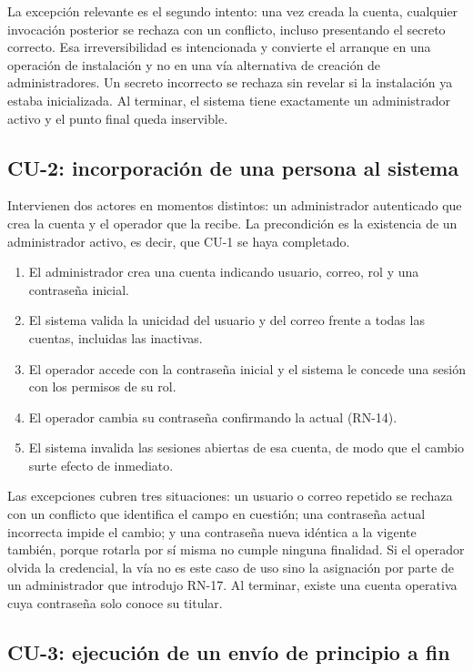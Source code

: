 La excepción relevante es el segundo intento: una vez creada la cuenta, cualquier invocación posterior se rechaza con un conflicto, incluso presentando el secreto correcto. Esa irreversibilidad es intencionada y convierte el arranque en una operación de instalación y no en una vía alternativa de creación de administradores. Un secreto incorrecto se rechaza sin revelar si la instalación ya estaba inicializada. Al terminar, el sistema tiene exactamente un administrador activo y el punto final queda inservible.

\subsection*{CU-2: incorporación de una persona al sistema}

Intervienen dos actores en momentos distintos: un administrador autenticado que crea la cuenta y el operador que la recibe. La precondición es la existencia de un administrador activo, es decir, que CU-1 se haya completado.

\begin{enumerate}
  \item El administrador crea una cuenta indicando usuario, correo, rol y una contraseña inicial.
  \item El sistema valida la unicidad del usuario y del correo frente a todas las cuentas, incluidas las inactivas.
  \item El operador accede con la contraseña inicial y el sistema le concede una sesión con los permisos de su rol.
  \item El operador cambia su contraseña confirmando la actual (RN-14).
  \item El sistema invalida las sesiones abiertas de esa cuenta, de modo que el cambio surte efecto de inmediato.
\end{enumerate}

Las excepciones cubren tres situaciones: un usuario o correo repetido se rechaza con un conflicto que identifica el campo en cuestión; una contraseña actual incorrecta impide el cambio; y una contraseña nueva idéntica a la vigente también, porque rotarla por sí misma no cumple ninguna finalidad. Si el operador olvida la credencial, la vía no es este caso de uso sino la asignación por parte de un administrador que introdujo RN-17. Al terminar, existe una cuenta operativa cuya contraseña solo conoce su titular.

\subsection*{CU-3: ejecución de un envío de principio a fin}

